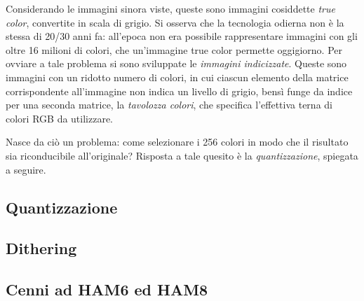 \documentclass{subfiles}
\begin{document}
Considerando le immagini sinora viste, queste sono immagini cosiddette \emph{true color}, convertite in scala di grigio.
Si osserva che la tecnologia odierna non è la stessa di 20/30 anni fa: all'epoca non era possibile rappresentare immagini con gli oltre 16 milioni di colori,
che un'immagine true color permette oggigiorno. Per ovviare a tale problema si sono sviluppate le \emph{immagini indicizzate}.
Queste sono immagini con un ridotto numero di colori\footnotemark[4], in cui ciascun elemento della matrice corrispondente all'immagine non indica un livello di grigio,
bensì funge da indice per una seconda matrice, la \emph{tavolozza colori}, che specifica l'effettiva terna di colori RGB da utilizzare.

Nasce da ciò un problema: come selezionare i 256 colori in modo che il risultato sia riconducibile all'originale?
Risposta a tale quesito è la \emph{quantizzazione}, spiegata a seguire.


\subsection{Quantizzazione}

\clearpage

\subsection{Dithering}

\clearpage

\subsection{Cenni ad HAM6 ed HAM8}

\clearpage
\end{document}

